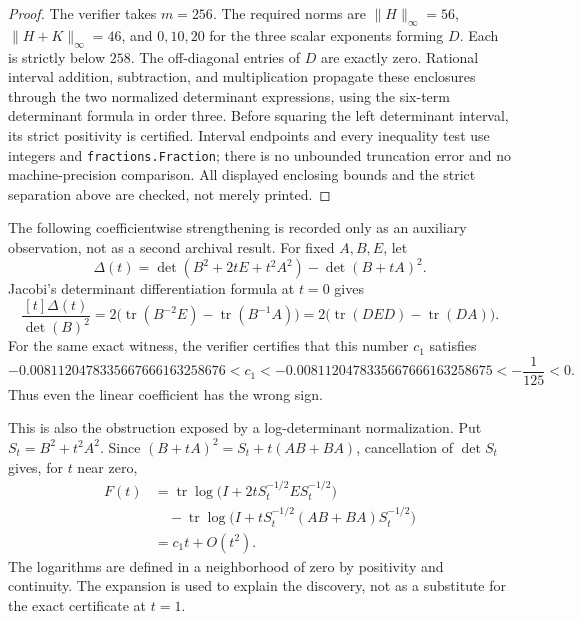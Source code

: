 \begin{cxrefutation}
\begin{proof}
The verifier takes $m=256$. The required norms are
$\|H\|_\infty=56$, $\|H+K\|_\infty=46$, and $0,10,20$ for the three
scalar exponents forming $D$. Each is strictly below $258$.
The off-diagonal entries of $D$ are exactly zero. Rational interval addition,
subtraction, and multiplication propagate these enclosures through the two
normalized determinant expressions, using the six-term determinant formula
in order three. Before squaring the left determinant interval, its strict
positivity is certified. Interval endpoints and every inequality test use
integers and \texttt{fractions.Fraction}; there is no unbounded truncation
error and no machine-precision comparison. All displayed enclosing bounds
and the strict separation above are checked, not merely printed.
\end{proof}

\begin{remark}
The following coefficientwise strengthening is recorded only as an auxiliary
observation, not as a second archival result.
For fixed $A,B,E$, let
\[
 \Delta(t)=\det(B^2+2tE+t^2A^2)-\det(B+tA)^2.
\]
Jacobi's determinant differentiation formula at $t=0$ gives
\[
 \frac{[t]\Delta(t)}{\det(B)^2}
 =2\bigl(\operatorname{tr}(B^{-2}E)
          -\operatorname{tr}(B^{-1}A)\bigr)
 =2\bigl(\operatorname{tr}(DED)-\operatorname{tr}(DA)\bigr).
\]
For the same exact witness, the verifier certifies that this number $c_1$
satisfies
\[
 -0.0081120478335667666163258676
 <c_1<
 -0.0081120478335667666163258675
 <-\frac1{125}<0.
\]
Thus even the linear coefficient has the wrong sign.

This is also the obstruction exposed by a log-determinant normalization.
Put $S_t=B^2+t^2A^2$. Since
$(B+tA)^2=S_t+t(AB+BA)$, cancellation of $\det S_t$ gives, for $t$ near zero,
\begin{align*}
 F(t)
 &=\operatorname{tr}\log\bigl(I+2tS_t^{-1/2}ES_t^{-1/2}\bigr)\\
 &\quad-\operatorname{tr}\log\bigl(I+tS_t^{-1/2}(AB+BA)S_t^{-1/2}\bigr)\\
 &=c_1t+O(t^2).
\end{align*}
The logarithms are defined in a neighborhood of zero by positivity and
continuity. The expansion is used to explain the discovery, not as a
substitute for the exact certificate at $t=1$.
\end{remark}


\end{cxrefutation}
